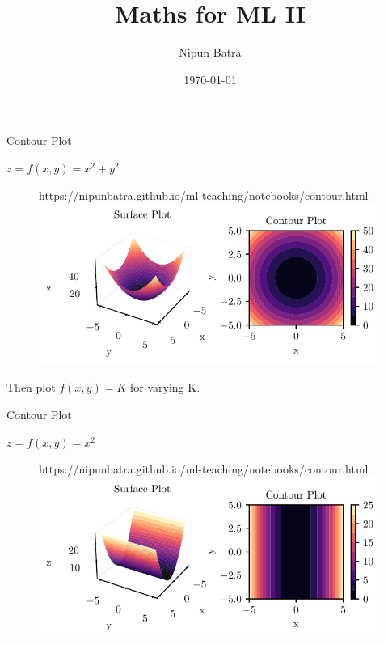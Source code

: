 \documentclass{beamer}
\title{Maths for ML II}
\date{\today}
\author{Nipun Batra}
\institute{IIT Gandhinagar}
\begin{document}
  \maketitle

\begin{frame}{Contour Plot}

	$z = f(x,y) = x^{2} + y^{2}$\\

	\begin{figure}[htp]
		\centering
		\begin{notebookbox}{https://nipunbatra.github.io/ml-teaching/notebooks/contour.html}
		  \includegraphics[width=\linewidth]{../assets/mathematical-ml/figures/contour-x_squared_plus_y_squared.pdf}
		\end{notebookbox}
	  \end{figure}

Then plot $f(x,y)=K$ for varying K.

\end{frame}

\begin{frame}{Contour Plot}

$z = f(x,y) = x^{2}$\\

\begin{figure}[htp]
	\centering
	\begin{notebookbox}{https://nipunbatra.github.io/ml-teaching/notebooks/contour.html}
	  \includegraphics[width=\linewidth]{../assets/mathematical-ml/figures/contour-x_squared.pdf}
	\end{notebookbox}
  \end{figure}

\end{frame}
\end{document}

